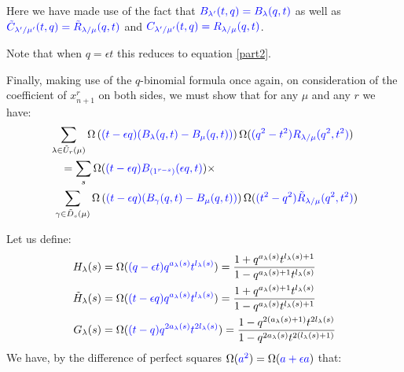 \documentclass[12pt,dvips]{amsart}
\begin{document}
\medskip
Here we have made use of the fact that ${\color{blue}B_{\lambda'}(t,q) = B_\lambda(q,t)}$ as well as ${\color{blue}\tilde{C}_{\lambda' / \mu'}(t,q) = \tilde{R}_{\lambda / \mu}(q,t)}$ and ${\color{blue}C_{\lambda' / \mu'}(t,q) = R_{\lambda / \mu}(q,t)}$. 

\medskip
\noindent
Note that when $q = \epsilon t$ this reduces to equation \eqref{part2}.


\medskip
\noindent
Finally, making use of the $q$-binomial formula once again, on consideration of the coefficient of $x_{n+1}^r$ on both sides, we must show that for any $\mu$ and any $r$ we have:
\begin{equation} \label{ident}\begin{split}
 &\sum_{\lambda \in \tilde{U}_r(\mu)} \Omega \left ( {\color{blue}(t - \epsilon q) (B_\lambda(q,t)  - B_\mu(q,t))} \right ) \Omega ( {\color{blue}(q^2 - t^2) R_{\lambda / \mu}(q^2,t^2)}) \\
&\quad = \sum_s \Omega({\color{blue}(t-\epsilon q)B_{(1^{r-s})}(\epsilon q, t)}) \times \\
&\  \sum_{\gamma \in \tilde{D}_s(\mu)} \Omega \left ( {\color{blue}(t - \epsilon q) (B_\gamma(q,t) - B_\mu(q,t))} \right ) \Omega({\color{blue}(t^2 - q^2) \tilde{R}_{\lambda / \mu}(q^2,t^2)})
\end{split}\end{equation}


\medskip
\noindent
Let us define:
\begin{align*}
H_\lambda(s) &= \Omega({\color{blue}(q-\epsilon t) q^{a_\lambda(s)} t^{l_\lambda(s)}}) 
= \frac{1+q^{a_\lambda(s)} t^{l_\lambda(s)+1}}{1 - q^{a_\lambda(s)+1} t^{l_\lambda(s)}}\\
\tilde{H}_\lambda(s) &= \Omega({\color{blue}(t-\epsilon q) q^{a_\lambda(s)} t^{l_\lambda(s)}}) 
= \frac{1+q^{a_\lambda(s)+1} t^{l_\lambda(s)}}{1 - q^{a_\lambda(s)} t^{l_\lambda(s)+1}}\\
G_\lambda(s) &= \Omega({\color{blue}(t - q) q^{2a_\lambda(s)} t^{2l_\lambda(s)}}) 
= \frac{1-q^{2(a_\lambda(s)+1)} t^{2l_\lambda(s)}}{1 - q^{2a_\lambda(s)} t^{2(l_\lambda(s)+1)}} \\
\end{align*}
We have, by the difference of perfect squares $\Omega({\color{blue}a^2}) = \Omega({\color{blue}a + \epsilon a})$ that:
\end{document}
